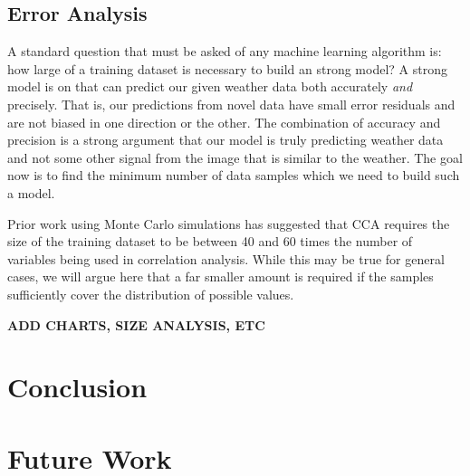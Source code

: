 \section{Error Analysis}
A standard question that must be asked of any machine learning algorithm is: how large of a training dataset is necessary to build an strong model? A strong model is on that can predict our given weather data both accurately \textit{and} precisely. That is, our predictions from novel data have small error residuals and are not biased in one direction or the other. The combination of accuracy and precision is a strong argument that our model is truly predicting weather data and not some other signal from the image that is similar to the weather. The goal now is to find the minimum number of data samples which we need to build such a model. 

Prior work \cite{barcikowski} using Monte Carlo simulations has suggested that CCA requires the size of the training dataset to be between 40 and 60 times the number of variables being used in correlation analysis. While this may be true for general cases, we will argue here that a far smaller amount is required if the samples sufficiently cover the distribution of possible values.

\textbf{ADD CHARTS, SIZE ANALYSIS, ETC}

\chapter{Conclusion}
\label{cpt:conclusion}

\chapter{Future Work}
\label{cpt:future}